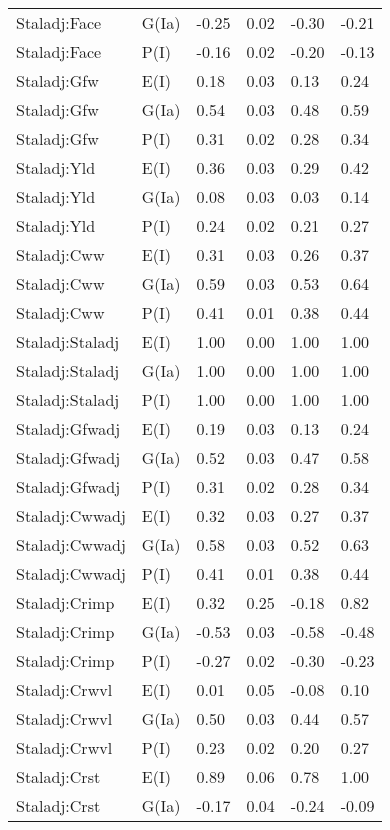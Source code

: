 \begin{center}
\begin{longtable}{|p{1.1in}|p{0.7in}|p{0.7in}|p{0.6in}|p{0.6in}|p{0.6in}|}
  Staladj:Face & G(Ia) & -0.25 & 0.02 & -0.30 & -0.21 \\ 
  Staladj:Face & P(I) & -0.16 & 0.02 & -0.20 & -0.13 \\ 
  Staladj:Gfw & E(I) & 0.18 & 0.03 & 0.13 & 0.24 \\ 
  Staladj:Gfw & G(Ia) & 0.54 & 0.03 & 0.48 & 0.59 \\ 
  Staladj:Gfw & P(I) & 0.31 & 0.02 & 0.28 & 0.34 \\ 
  Staladj:Yld & E(I) & 0.36 & 0.03 & 0.29 & 0.42 \\ 
  Staladj:Yld & G(Ia) & 0.08 & 0.03 & 0.03 & 0.14 \\ 
  Staladj:Yld & P(I) & 0.24 & 0.02 & 0.21 & 0.27 \\ 
  Staladj:Cww & E(I) & 0.31 & 0.03 & 0.26 & 0.37 \\ 
  Staladj:Cww & G(Ia) & 0.59 & 0.03 & 0.53 & 0.64 \\ 
  Staladj:Cww & P(I) & 0.41 & 0.01 & 0.38 & 0.44 \\ 
  Staladj:Staladj & E(I) & 1.00 & 0.00 & 1.00 & 1.00 \\ 
  Staladj:Staladj & G(Ia) & 1.00 & 0.00 & 1.00 & 1.00 \\ 
  Staladj:Staladj & P(I) & 1.00 & 0.00 & 1.00 & 1.00 \\ 
  Staladj:Gfwadj & E(I) & 0.19 & 0.03 & 0.13 & 0.24 \\ 
  Staladj:Gfwadj & G(Ia) & 0.52 & 0.03 & 0.47 & 0.58 \\ 
  Staladj:Gfwadj & P(I) & 0.31 & 0.02 & 0.28 & 0.34 \\ 
  Staladj:Cwwadj & E(I) & 0.32 & 0.03 & 0.27 & 0.37 \\ 
  Staladj:Cwwadj & G(Ia) & 0.58 & 0.03 & 0.52 & 0.63 \\ 
  Staladj:Cwwadj & P(I) & 0.41 & 0.01 & 0.38 & 0.44 \\ 
  Staladj:Crimp & E(I) & 0.32 & 0.25 & -0.18 & 0.82 \\ 
  Staladj:Crimp & G(Ia) & -0.53 & 0.03 & -0.58 & -0.48 \\ 
  Staladj:Crimp & P(I) & -0.27 & 0.02 & -0.30 & -0.23 \\ 
  Staladj:Crwvl & E(I) & 0.01 & 0.05 & -0.08 & 0.10 \\ 
  Staladj:Crwvl & G(Ia) & 0.50 & 0.03 & 0.44 & 0.57 \\ 
  Staladj:Crwvl & P(I) & 0.23 & 0.02 & 0.20 & 0.27 \\ 
  Staladj:Crst & E(I) & 0.89 & 0.06 & 0.78 & 1.00 \\ 
  Staladj:Crst & G(Ia) & -0.17 & 0.04 & -0.24 & -0.09 \\ 

\end{longtable}
\end{center}
